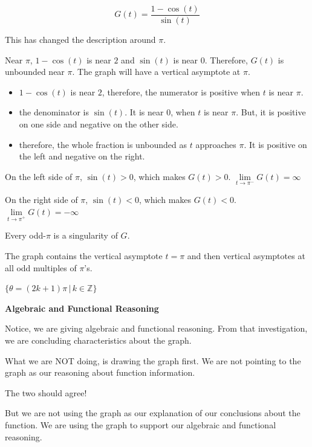 \documentclass{ximera}
\begin{document}
\[    G(t) = \frac{1-\cos(t)}{\sin(t)}  \]



This has changed the description around $\pi$. 

Near $\pi$, $1-\cos(t)$ is near $2$ and $\sin(t)$ is near $0$.  Therefore, $G(t)$ is unbounded near $\pi$.  The graph will have a vertical asymptote at $\pi$.


\begin{itemize}
\item $1-\cos(t)$ is near $2$, therefore, the numerator is positive when $t$ is near $\pi$.
\item the denominator is $\sin(t)$. It is near $0$, when $t$ is near $\pi$. But, it is positive on one side and negative on the other side.
\item therefore, the whole fraction is unbounded as $t$ approaches $\pi$.  It is positive on the left and negative on the right.
\end{itemize}




On the left side of $\pi$, $\sin(t) > 0$, which makes $G(t) > 0$.   $\lim\limits_{t \to \pi^{-}}G(t) = \infty$ 

On the right side of $\pi$, $\sin(t) < 0$, which makes $G(t) < 0$.   $\lim\limits_{t \to \pi^{+}}G(t) = -\infty$ 








Every odd-$\pi$ is a singularity of $G$.


The graph contains the vertical asymptote $t=\pi$ and then vertical asymptotes at all odd multiples of $\pi$'s. 




$\{  \theta = (2k+1) \pi \, | \, k \in \mathbb{Z}   \}$




\begin{warning} \textbf{\textcolor{red!70!black}{Algebraic and Functional Reasoning}}


Notice, we are giving algebraic and functional reasoning.  From that investigation, we are concluding characteristics about the graph. 

What we are NOT doing, is drawing the graph first.  We are not pointing to the graph as our reasoning about function information. 


The two should agree!  

But we are not using the graph as our explanation of our conclusions about the function.  We are using the graph to support our algebraic and functional reasoning.


\end{warning}
\end{document}

